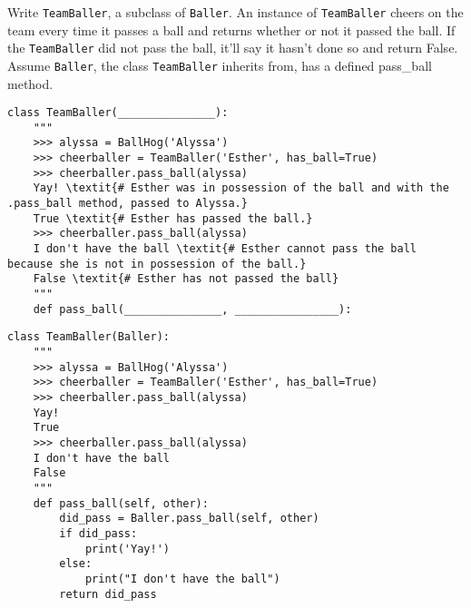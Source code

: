 \begin{blocksection}
\question Write \lstinline$TeamBaller$, a subclass of \lstinline$Baller$. An instance of \lstinline$TeamBaller$ cheers on the team every time it passes a ball and returns whether or not it passed the ball. If the \lstinline$TeamBaller$ did not pass the ball, it'll say it hasn't done so and return False. Assume \lstinline$Baller$, the class \lstinline$TeamBaller$ inherits from, has a defined pass_ball method.

\ifprintanswers\else
\begin{lstlisting}
class TeamBaller(_______________):
    """
    >>> alyssa = BallHog('Alyssa')
    >>> cheerballer = TeamBaller('Esther', has_ball=True)
    >>> cheerballer.pass_ball(alyssa)
    Yay! \textit{# Esther was in possession of the ball and with the .pass_ball method, passed to Alyssa.}
    True \textit{# Esther has passed the ball.}
    >>> cheerballer.pass_ball(alyssa)
    I don't have the ball \textit{# Esther cannot pass the ball because she is not in possession of the ball.}
    False \textit{# Esther has not passed the ball}
    """
    def pass_ball(_______________, ________________):
\end{lstlisting}
\fi

\begin{solution}[1in]
\begin{lstlisting}
class TeamBaller(Baller):
    """
    >>> alyssa = BallHog('Alyssa')
    >>> cheerballer = TeamBaller('Esther', has_ball=True)
    >>> cheerballer.pass_ball(alyssa)
    Yay!
    True
    >>> cheerballer.pass_ball(alyssa)
    I don't have the ball
    False
    """
    def pass_ball(self, other):
        did_pass = Baller.pass_ball(self, other)
        if did_pass:
            print('Yay!')
        else:
            print("I don't have the ball")
        return did_pass
\end{lstlisting}
\end{solution}


\end{blocksection}
